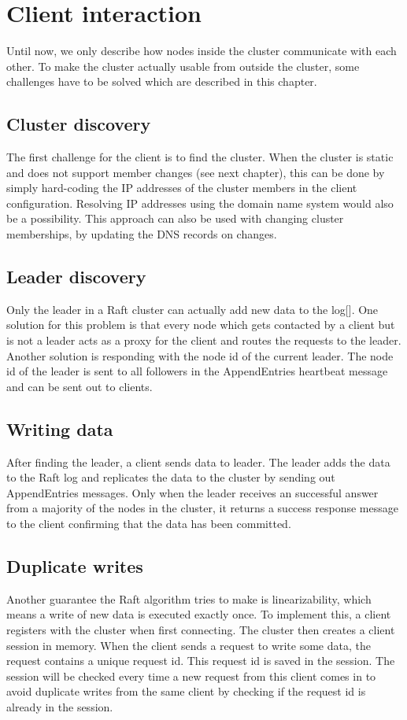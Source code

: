 \section{Client interaction}

Until now, we only describe how nodes inside the cluster communicate with each other. To make the cluster actually usable from outside the cluster, some challenges have to be solved which are described in this chapter.

\subsection{Cluster discovery}
The first challenge for the client is to find the cluster. When the cluster is static and does not support member changes (see next chapter), this can be done by simply hard-coding the IP addresses of the cluster members in the client configuration. Resolving IP addresses using the domain name system would also be a possibility. This approach can also be used with changing cluster memberships, by updating the DNS records on changes.

\subsection{Leader discovery}
Only the leader in a Raft cluster can actually add new data to the log[]. One solution for this problem is that every node which gets contacted by a client but is not a leader acts as a proxy for the client and routes the requests to the leader. Another solution is responding with the node id of the current leader. The node id of the leader is sent to all followers in the AppendEntries heartbeat message and can be sent out to clients.

\subsection{Writing data}
After finding the leader, a client sends data to leader. The leader adds the data to the Raft log and replicates the data to the cluster by sending out AppendEntries messages. Only when the leader receives an successful answer from a majority of the nodes in the cluster, it returns a success response message to the client confirming that the data has been committed.

\subsection{Duplicate writes}
Another guarantee the Raft algorithm tries to make is linearizability, which means a write of new data is executed exactly once. To implement this, a client registers with the cluster when first connecting. The cluster then creates a client session in memory. When the client sends a request to write some data, the request contains a unique request id. This request id is saved in the session. The session will be checked every time a new request from this client comes in to avoid duplicate writes from the same client by checking if the request id is already in the session.

